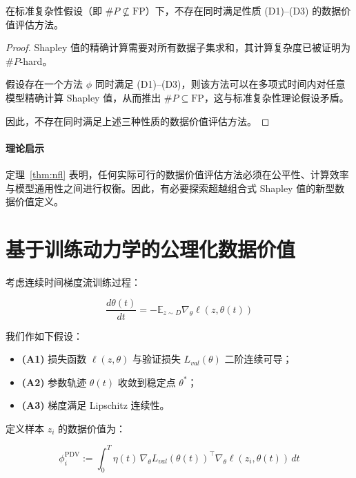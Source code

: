 \begin{theorem}[精确数据价值评估的计算复杂度]
\label{thm:nfl}
在标准复杂性假设（即 $\#P \nsubseteq \mathrm{FP}$）下，不存在同时满足性质 (D1)--(D3) 的数据价值评估方法。
\end{theorem}

\begin{proof}
Shapley 值的精确计算需要对所有数据子集求和，其计算复杂度已被证明为$\#P$-hard\cite{andos2012computation}。

假设存在一个方法 $\phi$ 同时满足 (D1)--(D3)，则该方法可以在多项式时间内对任意模型精确计算 Shapley 值，从而推出 $\#P \subseteq \mathrm{FP}$，这与标准复杂性理论假设矛盾。

因此，不存在同时满足上述三种性质的数据价值评估方法。
\end{proof}

\paragraph{理论启示}
定理~\ref{thm:nfl} 表明，任何实际可行的数据价值评估方法必须在公平性、计算效率与模型通用性之间进行权衡。因此，有必要探索超越组合式 Shapley 值的新型数据价值定义。

\section{基于训练动力学的公理化数据价值}
\label{sec:pdv}

考虑连续时间梯度流训练过程：

\begin{equation}
\frac{d\theta(t)}{dt} = - \mathbb{E}_{z \sim D} \nabla_\theta \ell(z, \theta(t))
\end{equation}

我们作如下假设：

\begin{itemize}
    \item \textbf{(A1)} 损失函数 $\ell(z, \theta)$ 与验证损失 $L_{val}(\theta)$ 二阶连续可导；
    
    \item \textbf{(A2)} 参数轨迹 $\theta(t)$ 收敛到稳定点 $\theta^*$；
    
    \item \textbf{(A3)} 梯度满足 Lipschitz 连续性。
\end{itemize}

\begin{definition}
\label{def:pdv}
定义样本 $z_i$ 的数据价值为：

\begin{equation}
\phi_i^{\mathrm{PDV}} :=
\int_0^T 
\eta(t)\,
\nabla_\theta L_{val}(\theta(t))^\top 
\nabla_\theta \ell(z_i, \theta(t)) \, dt
\end{equation}
\end{definition}

